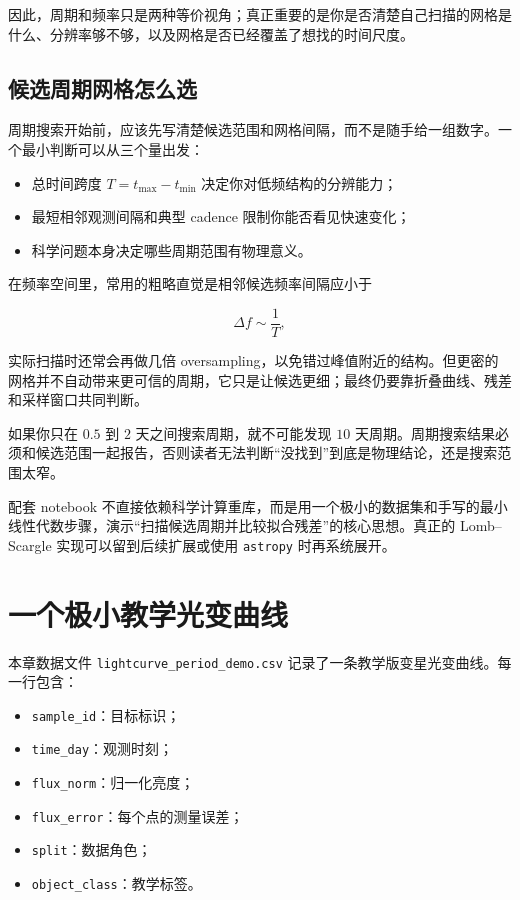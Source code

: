 因此，周期和频率只是两种等价视角；真正重要的是你是否清楚自己扫描的网格是什么、分辨率够不够，以及网格是否已经覆盖了想找的时间尺度。

\subsection{候选周期网格怎么选}

周期搜索开始前，应该先写清楚候选范围和网格间隔，而不是随手给一组数字。一个最小判断可以从三个量出发：

\begin{itemize}
    \item 总时间跨度 $T=t_{\max}-t_{\min}$ 决定你对低频结构的分辨能力；
    \item 最短相邻观测间隔和典型 cadence 限制你能否看见快速变化；
    \item 科学问题本身决定哪些周期范围有物理意义。
\end{itemize}

在频率空间里，常用的粗略直觉是相邻候选频率间隔应小于

\[
\Delta f \sim \frac{1}{T},
\]

实际扫描时还常会再做几倍 oversampling，以免错过峰值附近的结构。但更密的网格并不自动带来更可信的周期，它只是让候选更细；最终仍要靠折叠曲线、残差和采样窗口共同判断。

\begin{warnbox}[搜索范围本身也是假设]
如果你只在 $0.5$ 到 $2$ 天之间搜索周期，就不可能发现 $10$ 天周期。周期搜索结果必须和候选范围一起报告，否则读者无法判断“没找到”到底是物理结论，还是搜索范围太窄。
\end{warnbox}

\begin{protip}
配套 notebook 不直接依赖科学计算重库，而是用一个极小的数据集和手写的最小线性代数步骤，演示“扫描候选周期并比较拟合残差”的核心思想。真正的 Lomb--Scargle 实现可以留到后续扩展或使用 \texttt{astropy} 时再系统展开。
\end{protip}

\section{一个极小教学光变曲线}

本章数据文件 \nolinkurl{lightcurve_period_demo.csv} 记录了一条教学版变星光变曲线。每一行包含：

\begin{itemize}
    \item \texttt{sample\_id}：目标标识；
    \item \texttt{time\_day}：观测时刻；
    \item \texttt{flux\_norm}：归一化亮度；
    \item \texttt{flux\_error}：每个点的测量误差；
    \item \texttt{split}：数据角色；
    \item \texttt{object\_class}：教学标签。
\end{itemize}

